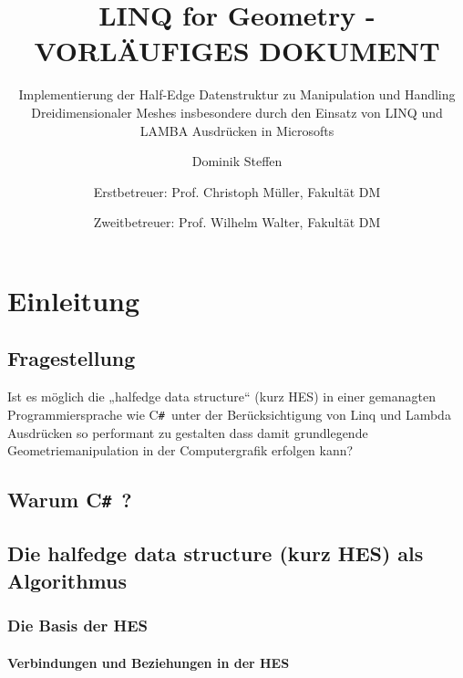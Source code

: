 \documentclass[12pt,a4paper]{scrreprt}
\author{
Dominik Steffen \and
Erstbetreuer: Prof. Christoph Müller, Fakultät DM \and
Zweitbetreuer: Prof. Wilhelm Walter, Fakultät DM
}
\title{LINQ for Geometry - VORLÄUFIGES DOKUMENT}
\subtitle{Implementierung der Half-Edge Datenstruktur zu Manipulation und Handling Dreidimensionaler Meshes insbesondere durch den Einsatz von LINQ und LAMBA Ausdrücken in Microsofts \CS}
\newcommand{\CSS}{C\texttt{\# }}
\begin{document}
\maketitle
\newpage

\begingroup
	\clearpage
	\pagestyle{empty}
	\renewcommand*{\chapterpagestyle}{empty}
	\tableofcontents
	\clearpage
\endgroup

\pagestyle{plain}
\setcounter{page}{1}










\chapter {Einleitung}
	\section {Fragestellung}
		Ist es möglich die „halfedge data structure“ (kurz HES) in einer gemanagten Programmiersprache wie \CSS unter der Berücksichtigung von Linq und Lambda Ausdrücken so performant zu gestalten dass damit grundlegende Geometriemanipulation in der Computergrafik erfolgen kann?
	\section {Warum \CSS ?}
	\section {Die halfedge data structure (kurz HES) als Algorithmus}
		\subsection {Die Basis der HES}
			\subsubsection {Verbindungen und Beziehungen in der HES}
\end{document}
